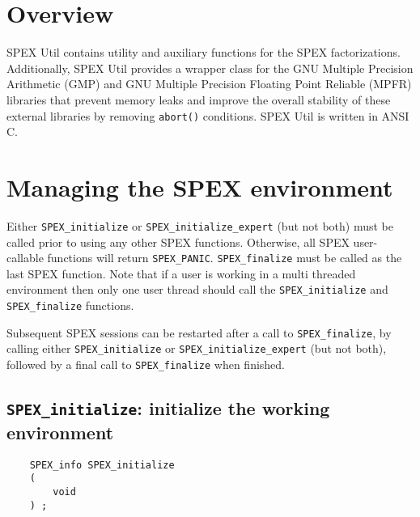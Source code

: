 \documentclass[12pt,oneside]{book}
\theoremstyle{definition}
\begin{document}
\section{Overview} \label{s:util:overview}
SPEX Util contains utility and auxiliary functions for the SPEX 
factorizations. Additionally, SPEX Util provides a wrapper class for
the GNU Multiple Precision Arithmetic (GMP) \cite{granlund2015gnu} and GNU
Multiple Precision Floating Point Reliable (MPFR) \cite{fousse2007mpfr}
libraries that prevent memory leaks and improve the overall stability of
these external libraries by removing \verb|abort()| conditions. SPEX Util is written in ANSI C.


\section{Managing the SPEX environment} \label{s:user:setup}
Either \verb|SPEX_initialize| or \verb|SPEX_initialize_expert| (but not both)
must be called prior to using any other SPEX functions. Otherwise, all SPEX user-callable functions will return \verb|SPEX_PANIC|. \verb|SPEX_finalize|
must be called as the last SPEX function. 
Note that if a user is working in a multi threaded environment then only one user thread should call the \verb|SPEX_initialize| and \verb|SPEX_finalize| functions.

Subsequent SPEX sessions can be restarted after a call to
\verb|SPEX_finalize|, by calling either \verb|SPEX_initialize| or
\verb|SPEX_initialize_expert| (but not both), followed by a final call to
\verb|SPEX_finalize| when finished.


\subsection{\texttt{SPEX\_initialize}: initialize the working environment}
\begin{mdframed}[userdefinedwidth=\textwidth]
{\footnotesize
\begin{verbatim}
    SPEX_info SPEX_initialize
    (
        void
    ) ;
\end{verbatim}
} \end{mdframed}
\end{document}
